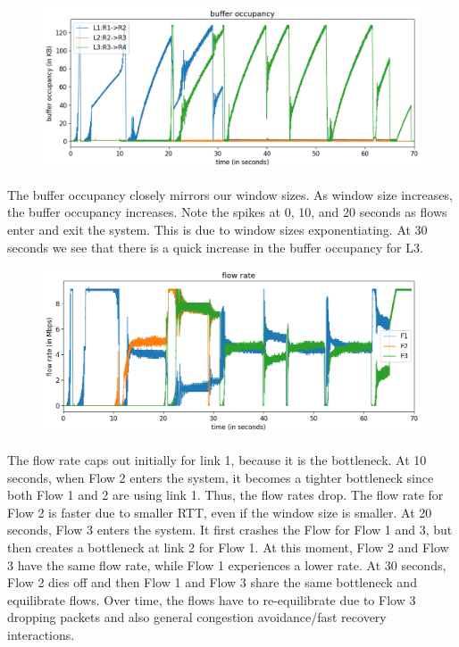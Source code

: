 \documentclass{article}
\begin{document}
\begin{figure}[H]
\centering
\includegraphics[width = \textwidth]{test_case2_reno buffer occupancy.png}
\end{figure}

The buffer occupancy closely mirrors our window sizes. As window size increases, the buffer occupancy increases. Note the spikes at 0, 10, and 20 seconds as flows enter and exit the system. This is due to window sizes exponentiating. At 30 seconds we see that there is a quick increase in the buffer occupancy for L3.

\begin{figure}[H]
\centering
\includegraphics[width = \textwidth]{test_case2_reno flow rate.png}
\end{figure}

The flow rate caps out initially for link 1, because it is the bottleneck. At 10 seconds, when Flow 2 enters the system, it becomes a tighter bottleneck since both Flow 1 and 2 are using link 1. Thus, the flow rates drop. The flow rate for Flow 2 is faster due to smaller RTT, even if the window size is smaller. At 20 seconds, Flow 3 enters the system. It first crashes the Flow for Flow 1 and 3, but then creates a bottleneck at link 2 for Flow 1. At this moment, Flow 2 and Flow 3 have the same flow rate, while Flow 1 experiences a lower rate. At 30 seconds, Flow 2 dies off and then Flow 1 and Flow 3 share the same bottleneck and equilibrate flows.  Over time, the flows have to re-equilibrate due to Flow 3 dropping packets and also general congestion avoidance/fast recovery interactions.
\end{document}
